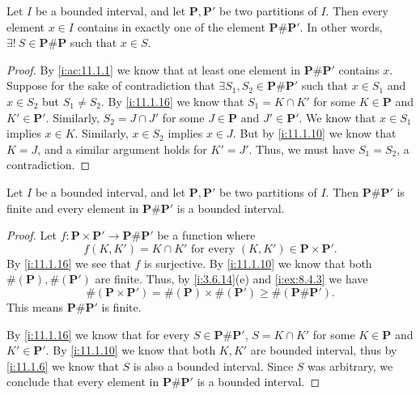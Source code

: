 \begin{ac}\label{i:ac:11.1.2}
  Let \(I\) be a bounded interval, and let \(\mathbf{P}, \mathbf{P}'\) be two partitions of \(I\).
  Then every element \(x \in I\) contains in exactly one of the element \(\mathbf{P} \# \mathbf{P}'\).
  In other words, \(\exists!\ S \in \mathbf{P} \# \mathbf{P}\) such that \(x \in S\).
\end{ac}

\begin{proof}
  By \cref{i:ac:11.1.1} we know that at least one element in \(\mathbf{P} \# \mathbf{P}'\) contains \(x\).
  Suppose for the sake of contradiction that \(\exists S_1, S_2 \in \mathbf{P} \# \mathbf{P}'\) such that \(x \in S_1\) and \(x \in S_2\) but \(S_1 \neq S_2\).
  By \cref{i:11.1.16} we know that \(S_1 = K \cap K'\) for some \(K \in \mathbf{P}\) and \(K' \in \mathbf{P}'\).
  Similarly, \(S_2 = J \cap J'\) for some \(J \in \mathbf{P}\) and \(J' \in \mathbf{P}'\).
  We know that \(x \in S_1\) implies \(x \in K\).
  Similarly, \(x \in S_2\) implies \(x \in J\).
  But by \cref{i:11.1.10} we know that \(K = J\), and a similar argument holds for \(K' = J'\).
  Thus, we must have \(S_1 = S_2\), a contradiction.
\end{proof}

\begin{ac}\label{i:ac:11.1.3}
  Let \(I\) be a bounded interval, and let \(\mathbf{P}, \mathbf{P}'\) be two partitions of \(I\).
  Then \(\mathbf{P} \# \mathbf{P}'\) is finite and every element in \(\mathbf{P} \# \mathbf{P}'\) is a bounded interval.
\end{ac}

\begin{proof}
  Let \(f : \mathbf{P} \times \mathbf{P}' \to \mathbf{P} \# \mathbf{P}'\) be a function where
  \[
    f(K, K') = K \cap K' \text{ for every } (K, K') \in \mathbf{P} \times \mathbf{P}'.
  \]
  By \cref{i:11.1.16} we see that \(f\) is surjective.
  By \cref{i:11.1.10} we know that both \(\#(\mathbf{P}), \#(\mathbf{P}')\) are finite.
  Thus, by \cref{i:3.6.14}(e) and \cref{i:ex:8.4.3} we have
  \[
    \#(\mathbf{P} \times \mathbf{P}') = \#(\mathbf{P}) \times \#(\mathbf{P}') \geq \#(\mathbf{P} \# \mathbf{P}').
  \]
  This means \(\mathbf{P} \# \mathbf{P}'\) is finite.

  By \cref{i:11.1.16} we know that for every \(S \in \mathbf{P} \# \mathbf{P}'\), \(S = K \cap K'\) for some \(K \in \mathbf{P}\) and \(K' \in \mathbf{P}'\).
  By \cref{i:11.1.10} we know that both \(K, K'\) are bounded interval, thus by \cref{i:11.1.6} we know that \(S\) is also a bounded interval.
  Since \(S\) was arbitrary, we conclude that every element in \(\mathbf{P} \# \mathbf{P}'\) is a bounded interval.
\end{proof}

